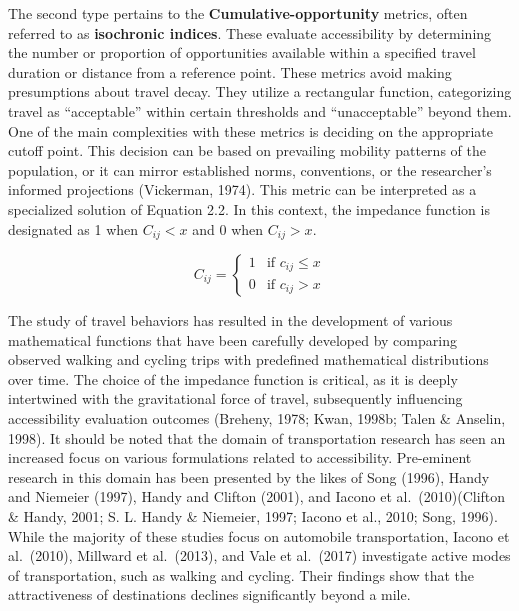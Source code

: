 \documentclass[
11pt, %
oneside, %
english, %
singlespacing, %
]{macthesis} %
\begin{document}
The second type pertains to the \textbf{Cumulative-opportunity} metrics, often referred to as \textbf{isochronic indices}. These evaluate accessibility by determining the number or proportion of opportunities available within a specified travel duration or distance from a reference point. These metrics avoid making presumptions about travel decay. They utilize a rectangular function, categorizing travel as ``acceptable'' within certain thresholds and ``unacceptable'' beyond them. One of the main complexities with these metrics is deciding on the appropriate cutoff point. This decision can be based on prevailing mobility patterns of the population, or it can mirror established norms, conventions, or the researcher's informed projections (Vickerman, 1974). This metric can be interpreted as a specialized solution of Equation 2.2. In this context, the impedance function is designated as 1 when \(C_{ij}< x\) and 0 when \(C_{ij} > x\).

\begin{equation}
C_{ij} =
\begin{cases}
  1 & \text{if } c_{ij} \le x \\
  0 & \text{if } c_{ij} > x
\end{cases}
\label{eq:Rectangular form of impedance function}
\end{equation}

The study of travel behaviors has resulted in the development of various mathematical functions that have been carefully developed by comparing observed walking and cycling trips with predefined mathematical distributions over time. The choice of the impedance function is critical, as it is deeply intertwined with the gravitational force of travel, subsequently influencing accessibility evaluation outcomes (Breheny, 1978; Kwan, 1998b; Talen \& Anselin, 1998). It should be noted that the domain of transportation research has seen an increased focus on various formulations related to accessibility. Pre-eminent research in this domain has been presented by the likes of Song (1996), Handy and Niemeier (1997), Handy and Clifton (2001), and Iacono et al.~(2010)(Clifton \& Handy, 2001; S. L. Handy \& Niemeier, 1997; Iacono et al., 2010; Song, 1996). While the majority of these studies focus on automobile transportation, Iacono et al.~(2010), Millward et al.~(2013), and Vale et al.~(2017) investigate active modes of transportation, such as walking and cycling. Their findings show that the attractiveness of destinations declines significantly beyond a mile.
\end{document}

